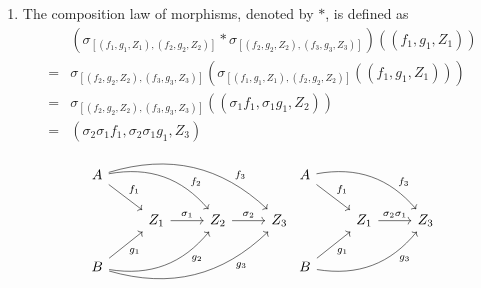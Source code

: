 \begin{solution}
\begin{enumerate}
\item The composition law of morphisms, denoted by $\ast$, is defined as
\begin{equation*}
\begin{split}
&(\sigma_{[(f_1,g_1,Z_1),(f_2,g_2,Z_2)]}\ast \sigma_{[(f_2,g_2,Z_2),(f_3,g_3,Z_3)]})((f_1,g_1,Z_1))\\=&
\sigma_{[(f_2,g_2,Z_2),(f_3,g_3,Z_3)]}(\sigma_{[(f_1,g_1,Z_1),(f_2,g_2,Z_2)]}((f_1,g_1,Z_1)))\\=&
\sigma_{[(f_2,g_2,Z_2),(f_3,g_3,Z_3)]}((\sigma_1f_1,\sigma_1 g_1, Z_2))\\=&
(\sigma_2\sigma_1f_1, \sigma_2\sigma_1g_1,Z_3)
\end{split}
\end{equation*}
%
\[
\begin{tikzcd}
A \arrow[dr, "f_1"] \arrow[drr, bend left, "f_2" near end] \arrow[drrr, bend left, "f_3" near end] & & \\
& Z_1 \arrow[r, "\sigma_1"] & Z_2 \arrow[r, "\sigma_2"] & Z_3 \\
B \arrow[ur, "g_1"'] \arrow[urr, bend right, "g_2"' near end] \arrow[urrr, bend right, "g_3"' near end] & &
\end{tikzcd}
\begin{tikzcd}
A \arrow[dr, "f_1"] \arrow[drr, bend left, "f_3" near end] & \\
& Z_1 \arrow[r, "\sigma_2\sigma_1"] & Z_3 \\
B \arrow[ur, "g_1"'] \arrow[urr, bend right, "g_3"' near end] &
\end{tikzcd}
\]
%
\end{enumerate}


\end{solution}
